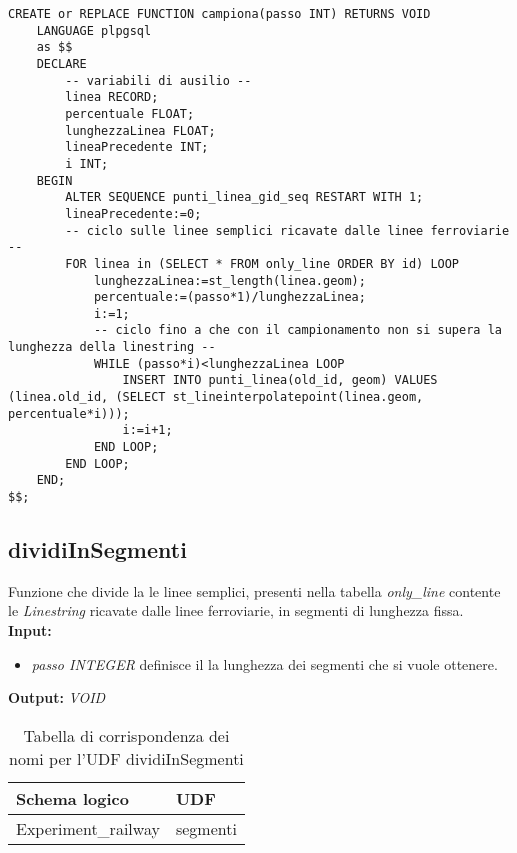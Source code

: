 \begin{lstlisting}[style=mySQL]
CREATE or REPLACE FUNCTION campiona(passo INT) RETURNS VOID
	LANGUAGE plpgsql
	as $$
	DECLARE
		-- variabili di ausilio --
		linea RECORD;
		percentuale FLOAT;
		lunghezzaLinea FLOAT;
		lineaPrecedente INT;
		i INT;
	BEGIN
		ALTER SEQUENCE punti_linea_gid_seq RESTART WITH 1;
		lineaPrecedente:=0;
		-- ciclo sulle linee semplici ricavate dalle linee ferroviarie --
		FOR linea in (SELECT * FROM only_line ORDER BY id) LOOP
			lunghezzaLinea:=st_length(linea.geom);
			percentuale:=(passo*1)/lunghezzaLinea;
			i:=1;
			-- ciclo fino a che con il campionamento non si supera la lunghezza della linestring --
			WHILE (passo*i)<lunghezzaLinea LOOP
				INSERT INTO punti_linea(old_id, geom) VALUES (linea.old_id, (SELECT st_lineinterpolatepoint(linea.geom, percentuale*i)));
				i:=i+1;
			END LOOP;
		END LOOP;
	END;
$$;
\end{lstlisting}

\subsection{\textbf{dividiInSegmenti}}
Funzione che divide la le linee semplici, presenti nella tabella \textit{only\_line} contente le \textit{Linestring} ricavate dalle linee ferroviarie, in segmenti di lunghezza fissa.\\
\textbf{Input:} 
\begin{itemize}
\item \textit{passo INTEGER} definisce il la lunghezza dei segmenti che si vuole ottenere.
\end{itemize}
\textbf{Output:} \textit{VOID} 

\begin{table}[h]
\centering
\caption{Tabella di corrispondenza dei nomi per l'UDF dividiInSegmenti}
\label{mapTb6}
\begin{tabular}{|l|l|}
\hline
Schema logico       & UDF                \\ \hline
Experiment\_railway          & segmenti              \\ \hline
\end{tabular}
\end{table}

